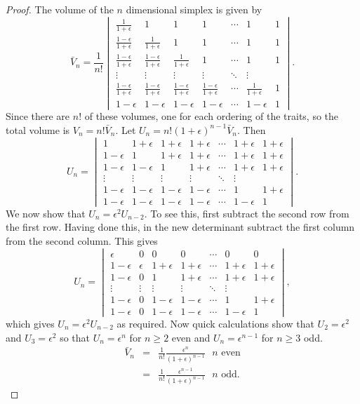 \begin{proof}
The volume of the $n$ dimensional simplex  is given by 
\[
\bar{V}_n=\frac{1}{n!}\begin{vmatrix}
\frac{1}{1+\epsilon}&1&1&1&\cdots &1&1\\
\frac{1-\epsilon}{1+\epsilon} & \frac{1}{1+\epsilon} & 1& 1& \cdots &1&1\\
\frac{1-\epsilon}{1+\epsilon} & \frac{1-\epsilon}{1+\epsilon}& \frac{1}{1+\epsilon} & 1& \cdots &1&1\\
\vdots&\vdots&\vdots&\vdots&\ddots&\vdots\\
\frac{1-\epsilon}{1+\epsilon} & \frac{1-\epsilon}{1+\epsilon}& \frac{1-\epsilon}{1+\epsilon} & \frac{1-\epsilon}{1+\epsilon}& \cdots &\frac{1}{1+\epsilon}& 1\\
1-\epsilon & 1-\epsilon & 1-\epsilon & 1-\epsilon& \cdots & 1-\epsilon & 1
 \end{vmatrix}.
\]
Since there are $n!$ of these volumes, one for each ordering of the traits, so the total volume is $V_{n} = n! \bar{V}_n$. Let $U_n = n! (1+\epsilon)^{n-1}\bar{V}_n$. Then 
\[
U_n=\begin{vmatrix}
1&1+\epsilon&1+\epsilon&1+\epsilon&\cdots &1+\epsilon&1+\epsilon\\
1-\epsilon& 1 & 1+\epsilon& 1+\epsilon& \cdots &1+\epsilon&1+\epsilon\\
1-\epsilon &1-\epsilon&1 & 1+\epsilon& \cdots &1+\epsilon&1+\epsilon\\
\vdots&\vdots&\vdots&\vdots&\ddots&\vdots\\
1-\epsilon&1-\epsilon&1-\epsilon&1-\epsilon& \cdots &1& 1+\epsilon\\
1-\epsilon& 1-\epsilon &1-\epsilon &1-\epsilon& \cdots &1-\epsilon& 1
 \end{vmatrix}.
\]
We now show that $U_n = \epsilon^2  U_{n-2}$. To see this, first subtract the second row from the first row. Having done this, in the new determinant subtract the first column from the second column. This gives
 \[
U_n=\begin{vmatrix}
\epsilon & 0 &0&0&\cdots &0&0\\
1-\epsilon& \epsilon & 1+\epsilon& 1+\epsilon& \cdots &1+\epsilon&1+\epsilon\\
1-\epsilon &0&1 & 1+\epsilon& \cdots &1+\epsilon&1+\epsilon\\
\vdots&\vdots&\vdots&\vdots&\ddots&\vdots\\
1-\epsilon&0&1-\epsilon&1-\epsilon& \cdots &1& 1+\epsilon\\
1-\epsilon& 0 &1-\epsilon &1-\epsilon& \cdots &1-\epsilon& 1
 \end{vmatrix},
\]
which gives $U_n = \epsilon^2 U_{n-2}$ as required. Now quick calculations show that $U_2=\epsilon^2$ and $ U_3 = \epsilon^2$ so that $U_n = \epsilon^n$ for $n\geq 2$ even and $ U_n = \epsilon^{n-1}$ for $n\geq 3$ odd.
 \begin{eqnarray*}
\bar{V}_{n} &=& \frac{1}{n!} \frac{\epsilon^n}{(1+\epsilon)^{n-1}} \mbox{ $n$ even}\\
 &=&\frac{1}{n!}\frac{\epsilon^{n-1}}{(1+\epsilon)^{n-1}} \mbox{ $n$ odd.}
 \end{eqnarray*}


\end{proof}

